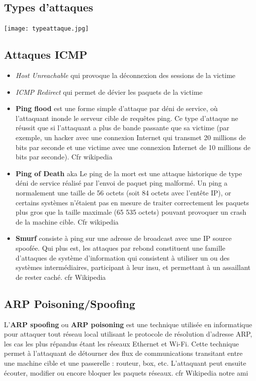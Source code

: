 \documentclass{report}
\begin{document}
\subsection{Types d'attaques}

\texttt{[image: typeattaque.jpg]}

\subsection{Attaques ICMP}

\begin{itemize}
    \item \textit{Host Unreachable} qui provoque la déconnexion des sessions de la victime
    \item \textit{ICMP Redirect} qui permet de dévier les paquets de la victime
    \item \textbf{Ping flood} est une forme simple d’attaque par déni de service, où l'attaquant inonde le serveur cible de requêtes ping. Ce type d’attaque ne réussit que si l'attaquant a plus de bande passante que sa victime (par exemple, un hacker avec une connexion Internet qui transmet 20 millions de bits par seconde et une victime avec une connexion Internet de 10 millions de bits par seconde). Cfr wikipedia
    \item \textbf{Ping of Death} aka Le ping de la mort est une attaque historique de type déni de service réalisé par l'envoi de paquet ping malformé. Un ping a normalement une taille de 56 octets (soit 84 octets avec l'entête IP), or certains systèmes n'étaient pas en mesure de traiter correctement les paquets plus gros que la taille maximale (65 535 octets) pouvant provoquer un crash de la machine cible. Cfr wikipedia
    \item \textbf{Smurf} consiste à ping sur une adresse de broadcast avec une IP source spoofée. Qui plus est, les attaques par rebond constituent une famille d'attaques de système d'information qui consistent à utiliser un ou des systèmes intermédiaires, participant à leur insu, et permettant à un assaillant de rester caché. cfr Wikipedia
\end{itemize}

\subsection{ARP Poisoning/Spoofing}

L'\textbf{ARP spoofing} ou \textbf{ARP poisoning} est une technique utilisée en informatique pour attaquer tout réseau local utilisant le protocole de résolution d'adresse ARP, les cas les plus répandus étant les réseaux Ethernet et Wi-Fi. Cette technique permet à l'attaquant de détourner des flux de communications transitant entre une machine cible et une passerelle : routeur, box, etc. L'attaquant peut ensuite écouter, modifier ou encore bloquer les paquets réseaux. cfr Wikipedia notre ami
\end{document}
